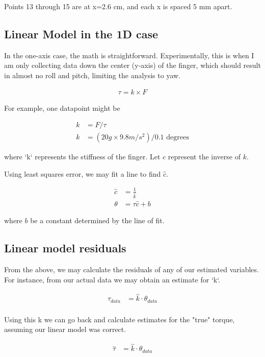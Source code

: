 \documentclass[preprint,12pt,3p]{elsarticle}
\begin{document}
Points 13 through 15 are at x=2.6 cm, and each x is spaced 5 mm apart.
\\

\subsection{Linear Model in the 1D case}

In the one-axis case, the math is straightforward. Experimentally, this is when I am only collecting
data down the center (y-axis) of the finger, which should result in almost no roll and pitch,
limiting the analysis to yaw. 

\begin{align}
\tau = k \times F
\end{align}

For example, one datapoint might be

\begin{align}
k &= F / \tau \\
k &= (20g \times 9.8 m/s^2)/0.1 \text{ degrees}
\end{align}

where `k` represents the stiffness of the finger. Let $c$ represent the inverse of $k$.

Using least squares error, we may fit a line to find $\hat{c}$. 

\begin{align}
 \hat{c} &= \frac{1}{\hat{k}} \\
 \theta &= \tau \hat{c} + b
\end{align}

where $b$ be a constant determined by the line of fit.



\subsection{Linear model residuals}

From the above, we may calculate the residuals of any of our estimated variables.
For instance, from our actual data we may obtain an estimate for `k`.

\begin{align}
 \tau_{data} &= \hat{k} \cdot \theta_{data} \\
\end{align}

Using this k we can go back and calculate estimates for the "true" torque, assuming our linear model was correct.

\begin{align}
 \hat{\tau} &= \hat{k} \cdot \theta_{data} 
\end{align}
\end{document}
